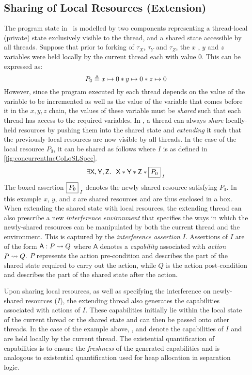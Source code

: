 \subsection{Sharing of Local Resources (Extension)}\label{subsec:extend}
The program state in \colosl\ is modelled by two components representing a thread-local (private) state exclusively visible to the thread, and a shared state accessible by all threads. Suppose that prior to forking of $\tau_X$, $\tau_Y$ and $\tau_Z$, the $x$ , $y$ and $z$ variables were held locally by the current thread each with value $0$. This can be expressed as:
%
\[
	P_{0} \mathrel{\triangleq} x \mapsto 0 * y \mapsto 0 * z \mapsto 0
\]
%
However, since the program executed by each thread depends on the value of the variable to be incremented as well as the value of the variable that comes before it in the $x, y, z$ chain, the values of these variable must be \emph{shared} such that each thread has access to the required variables. In \colosl, a thread can always \emph{share} locally-held resources by pushing them into the shared state and \emph{extending} it such that the previously-local resources are now visible by all threads. In the case of the local resource $P_0$, it can be shared as follows where $I$ is as defined in \fig\ref{fig:concurrentIncCoLoSLSpec}.
%
\[
	\exsts{\token{X}, \token{Y}, \token{Z}}\;\; \token{X} * \token{Y} * \token{Z} * \shared{P_0}{I}
\]
%
The boxed assertion $\shared{P_0}{I}$ denotes the newly-shared resource satisfying $P_0$. In this example $x$, $y$, and $z$ are shared resources and are thus enclosed in a box. 
When extending the shared state with local resources, the extending thread can also prescribe a new \emph{interference environment} that specifies the ways in which the newly-shared resources can be manipulated by both the current thread and the environment. This is captured by the \emph{interference assertion} $I$.
Assertions of $I$ are of the form $\textsf{A}: P \rightsquigarrow Q$ where $\textsf{A}$ denotes a \emph{capability} associated with \emph{action} $P \rightsquigarrow Q$. $P$ represents the action pre-condition and describes the part of the shared state required to carry out the action, while $Q$ is the action post-condition and describes the part of the shared state after the action. 

Upon sharing local resources, as well as specifying the interference on newly-shared resources ($I$), the extending thread also generates the capabilities associated with actions of $I$. These capabilities initially lie within the local state of the current thread or the shared state and can then be passed onto other threads. In the case of the example above, ,  and  denote the capabilities of $I$ and are held locally by the current thread. The existential quantification of capabilities is to ensure the \emph{freshness} of the generated capabilities and is analogous to existential quantification used for heap allocation in separation logic. 

